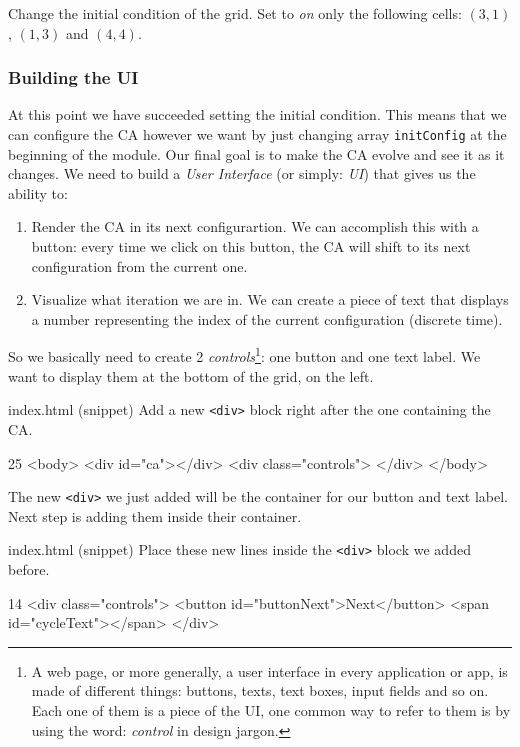 \begin{problem}
\label{prob:changeinit}
Change the initial condition of the grid. Set to \textit{on} only the following
cells: $(3,1)$, $(1,3)$ and $(4,4)$.
\end{problem}

\subsubsection{Building the UI}
At this point we have succeeded setting the initial condition. This means that we can configure the CA however
we want by just changing array \texttt{initConfig} at the beginning of the module. Our final goal is to
make the CA evolve and see it as it changes. We need to build a \textit{User Interface} (or simply: \textit{UI})
that gives us the ability to:

\begin{enumerate}
\item Render the CA in its next configurartion. We can accomplish this with a button: every time we
click on this button, the CA will shift to its next configuration from the current one.
\item Visualize what iteration we are in. We can create a piece of text that displays a number
representing the index of the current configuration (discrete time).
\end{enumerate}

So we basically need to create 2
\textit{controls}\footnote{A web page, or more generally, a user interface in every application or app, is made
of different things: buttons, texts, text boxes, input fields and so on. Each one of them is a piece of the UI,
one common way to refer to them is by using the word: \textit{control} in design jargon.}: one button and
one text label. We want to display them at the bottom of the grid, on the left.

\begin{programcode}{index.html (snippet)}
Add a new \texttt{<div>} block right after the one containing the CA.
\begin{codehtmlh1}{2}{5}
<body>
  <div id="ca"></div>
  <div class="controls">
  </div>
</body>
\end{codehtmlh1}
\end{programcode}

The new \texttt{<div>} we just added will be the container for our button and text label. Next step
is adding them inside their container.

\begin{programcode}{index.html (snippet)}
Place these new lines inside the \texttt{<div>} block we added before.
\begin{codehtmlh1}{1}{4}
<div class="controls">
  <button id="buttonNext">Next</button>
  <span id="cycleText"></span>
</div>
\end{codehtmlh1}
\end{programcode}

